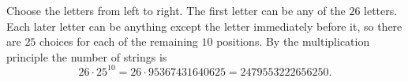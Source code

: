 Choose the letters from left to right. The first letter can be any of the $26$ letters. Each later letter can be anything except the letter immediately before it, so there are $25$ choices for each of the remaining $10$ positions. By the multiplication principle the number of strings is
\[26\cdot25^{10}=26\cdot95367431640625=\boxed{2479553222656250}.\]
